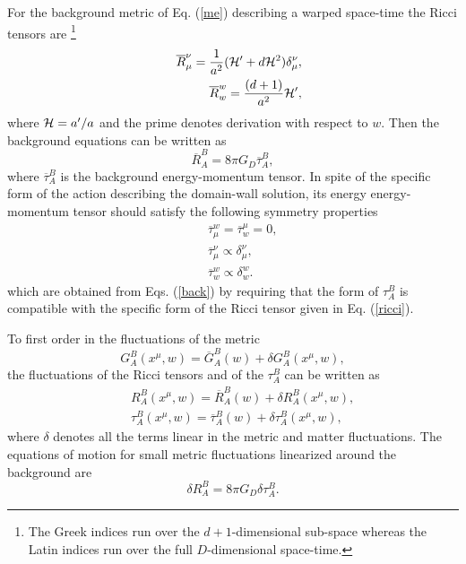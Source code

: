 \documentclass[a4paper,12pt]{article}
\begin{document}
For the background metric of  Eq. (\ref{me}) describing a warped 
space-time the Ricci tensors are \footnote{The Greek  indices run over the 
$d+1$-dimensional  sub-space whereas the Latin indices run over the full 
$D$-dimensional space-time.}  
\begin{eqnarray}
&& \overline{R}_{\mu}^{\nu} =  \frac{1}{a^2} ( {\cal H}' + d {\cal H}^2) 
\delta_{\mu}^{\nu},
\nonumber\\
&&\overline{R}_{w}^{w} = \frac{(d +1)}{a^2} {\cal H}' ,
\label{ricci}
\end{eqnarray}
where ${\cal H} = a'/a$ and the prime denotes derivation with 
respect to $w$.
Then the background equations can be written as
\begin{equation}
\overline{R}_{A}^{B} = 8 \pi G_{D} \overline{\tau}_{A}^{B} ,
\label{back}
\end{equation}
 where $\overline{\tau}_{A}^{B}$ is the background energy-momentum 
tensor. In spite of the specific 
form of the action describing 
the domain-wall solution, its energy energy-momentum tensor should satisfy the 
following symmetry properties
\begin{eqnarray}
&&\overline{\tau}_{\mu}^{w} = \overline{\tau}_{w}^{\mu} =0,
\nonumber\\
&&\overline{\tau}_{\mu}^{\nu} \propto \delta_{\mu}^{\nu}, 
\nonumber\\
&&\overline{\tau}_{w}^{w} \propto \delta_{w}^{w}. 
\label{backtens}
\end{eqnarray}
which are obtained from Eqs. (\ref{back}) by requiring that the 
form of $\tau_{A}^{B}$ is compatible with the specific form of the Ricci 
tensor given in Eq. (\ref{ricci}).

To first order in the fluctuations of the metric
\begin{equation}
G_{A}^{B}(x^{\mu}, w) = \overline{G}_{A}^{B}(w) + \delta G_{A}^{B}(x^{\mu}, w),
\end{equation}
the fluctuations of the Ricci tensors and of the $\tau_{A}^{B}$ can be 
written as 
\begin{eqnarray}
&&
R_{A}^{B} (x^{\mu}, w) = \overline{R}_{A}^{B}(w) +\delta R_{A}^{B}(x^{\mu}, w),
\label{ricpert}
\nonumber\\
&& 
\tau_{A}^{B} (x^{\mu}, w) = \overline{\tau}_{A}^{B}(w) 
+\delta \tau_{A}^{B}(x^{\mu}, w),
\end{eqnarray}
where $ \delta$ denotes all the terms linear in the metric and matter 
fluctuations.
The equations of motion for small metric fluctuations linearized 
around the background are
\begin{equation}
\delta R_{A}^{B} = 8 \pi G_{D} \delta \tau_{A}^{B}. 
\label{perteq}
\end{equation}
\end{document}
